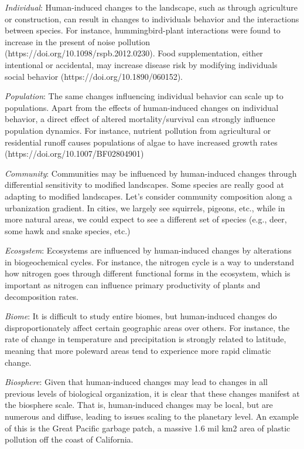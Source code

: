 \documentclass[12pt]{article}
\begin{document}
\textit{Individual}:
Human-induced changes to the landscape, such as through agriculture or construction, can result in changes to individuals behavior and the interactions between species. For instance, hummingbird-plant interactions were found to increase in the present of noise pollution (https://doi.org/10.1098/rspb.2012.0230). Food supplementation, either intentional or accidental, may increase disease risk by modifying individuals social behavior (https://doi.org/10.1890/060152). 


\bigskip


\textit{Population}:
The same changes influencing individual behavior can scale up to populations. Apart from the effects of human-induced changes on individual behavior, a direct effect of altered mortality/survival can strongly influence population dynamics. For instance, nutrient pollution from agricultural or residential runoff causes populations of algae to have increased growth rates (https://doi.org/10.1007/BF02804901)

\bigskip

\textit{Community}:
Communities may be influenced by human-induced changes through differential sensitivity to modified landscapes. Some species are really good at adapting to modified landscapes. Let's consider community composition along a urbanization gradient. In cities, we largely see squirrels, pigeons, etc., while in more natural areas, we could expect to see a different set of species (e.g., deer, some hawk and snake species, etc.)

\bigskip

\textit{Ecosystem}:
Ecosystems are influenced by human-induced changes by alterations in biogeochemical cycles. For instance, the nitrogen cycle is a way to understand how nitrogen goes through different functional forms in the ecosystem, which is important as nitrogen can influence primary productivity of plants and decomposition rates. 

\bigskip


\textit{Biome}: 
It is difficult to study entire biomes, but human-induced changes do disproportionately affect certain geographic areas over others. For instance, the rate of change in temperature and precipitation is strongly related to latitude, meaning that more poleward areas tend to experience more rapid climatic change. 


\bigskip


\textit{Biosphere}:
Given that human-induced changes may lead to changes in all previous levels of biological organization, it is clear that these changes manifest at the biosphere scale. That is, human-induced changes may be local, but are numerous and diffuse, leading to issues scaling to the planetary level. An example of this is the Great Pacific garbage patch, a massive 1.6 mil km2 area of plastic pollution off the coast of California. 
\end{document}
